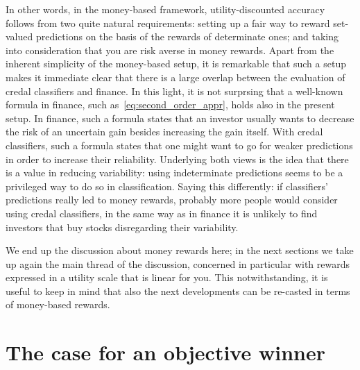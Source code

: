 \documentclass[a4paper,10pt,reqno]{amsart}
\theoremstyle{remark}
\begin{document}
In other words, in the money-based framework, utility-discounted accuracy follows from two quite natural requirements: setting up a fair way to reward set-valued predictions on the basis of the rewards of determinate ones; and taking into consideration that you are risk averse in money rewards. Apart from the inherent simplicity of the money-based setup, it is remarkable that such a setup makes it immediate clear that there is a large overlap between the evaluation of credal classifiers and finance. In this light, it is not surprsing that a well-known formula in finance, such as~\eqref{eq:second_order_appr}, holds also in the present setup. In finance, such a formula states that an investor usually wants to decrease the risk of an uncertain gain besides increasing the gain itself. With credal classifiers, such a formula states that one might want to go for weaker predictions in order to increase their reliability. Underlying both views is the idea that there is a value in reducing variability: using indeterminate predictions seems to be a privileged way to do so in classification. Saying this differently: if classifiers' predictions really led to money rewards, probably more people would consider using credal classifiers, in the same way as in finance it is unlikely to find investors that buy stocks disregarding their variability.

We end up the discussion about money rewards here; in the next sections we take up again the main thread of the discussion, concerned in particular with rewards expressed in a utility scale that is linear for you. This notwithstanding, it is useful to keep in mind that also the next developments can be re-casted in terms of money-based rewards.

% 

\section{The case for an objective winner}\label{sec:objwin}
\end{document}
